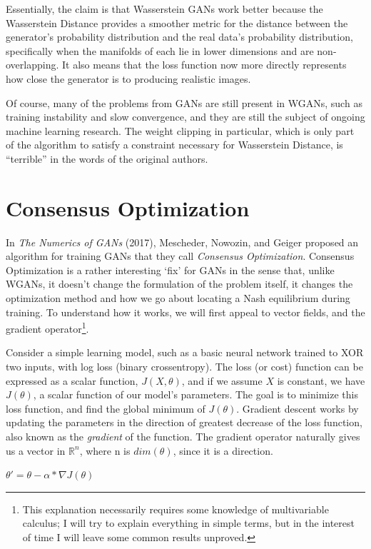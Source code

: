 \documentclass{article}
\begin{document}
Essentially, the claim is that Wasserstein GANs work better because the Wasserstein Distance provides a smoother metric for the distance between the generator's probability distribution and the real data's probability distribution, specifically when the manifolds of each lie in lower dimensions and are non-overlapping. It also means that the loss function now more directly represents how close the generator is to producing realistic images.

Of course, many of the problems from GANs are still present in WGANs, such as training instability and slow convergence, and they are still the subject of ongoing machine learning research. The weight clipping in particular, which is only part of the algorithm to satisfy a constraint necessary for Wasserstein Distance, is ``terrible'' in the words of the original authors.

\section{Consensus Optimization}
In \textit{The Numerics of GANs} (2017), Mescheder, Nowozin, and Geiger proposed an algorithm for training GANs that they call \textit{Consensus Optimization}. Consensus Optimization is a rather interesting `fix' for GANs in the sense that, unlike WGANs, it doesn't change the formulation of the problem itself, it changes the optimization method and how we go about locating a Nash equilibrium during training. To understand how it works, we will first appeal to vector fields, and the gradient operator\footnote{This explanation necessarily requires some knowledge of multivariable calculus; I will try to explain everything in simple terms, but in the interest of time I will leave some common results unproved.}.

Consider a simple learning model, such as a basic neural network trained to XOR two inputs, with log loss (binary crossentropy). The loss (or cost) function can be expressed as a scalar function, $J(X,\theta)$, and if we assume $X$ is constant, we have $J(\theta)$, a scalar function of our model's parameters. The goal is to minimize this loss function, and find the global minimum of $J(\theta)$. Gradient descent works by updating the parameters in the direction of greatest decrease of the loss function, also known as the \textit{gradient} of the function. The gradient operator naturally gives us a vector in $\mathbb{R}^n$, where n is $dim(\theta)$, since it is a direction.

\begin{center}
    $\theta'=\theta-\alpha*\nabla{J(\theta)}$
\end{center}
\end{document}
